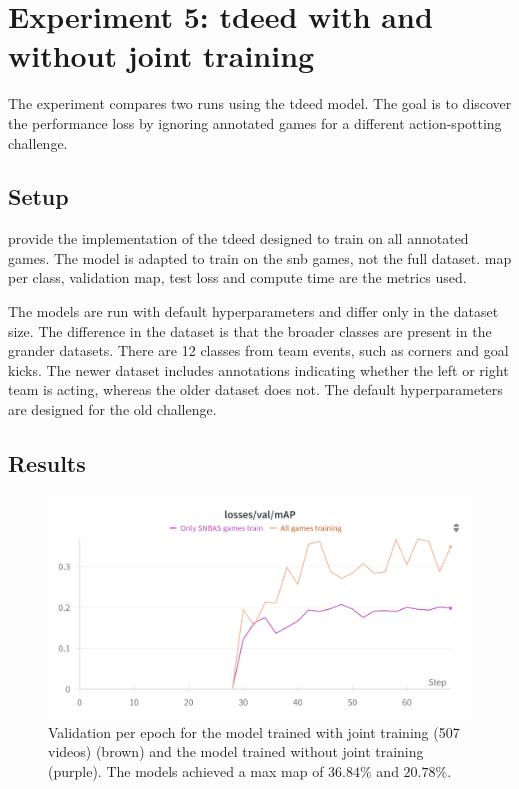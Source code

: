 \section{Experiment 5: \acrshort{tdeed} with and without joint training}
\label{sec:experiment_5}

The experiment compares two runs using the \acrfull{tdeed} model. The goal is to discover the performance loss by ignoring annotated games for a different action-spotting challenge. 

\subsection{Setup}
\label{ssec:ex5_setup}

\textcite{cioppa_soccernet_2024} provide the implementation of the \acrshort{tdeed} designed to train on all annotated games. The model is adapted to train on the \acrshort{snb} games, not the full dataset. \acrshort{map} per class, validation \acrshort{map}, test loss and compute time are the metrics used. 

The models are run with default hyperparameters and differ only in the dataset size. The difference in the dataset is that the broader classes are present in the grander datasets. There are 12 classes from team events, such as corners and goal kicks. The newer dataset includes annotations indicating whether the left or right team is acting, whereas the older dataset does not. The default hyperparameters are designed for the old challenge. 


\subsection{Results}
\label{ssec:ex5_results}

\begin{figure}
    \centering
    \includegraphics[width=0.75\linewidth]{figures/500_7_val_compare.png}
    \caption{Validation per epoch for the model trained with joint training (507 videos) (brown) and the model trained without joint training (purple). The models achieved a max \acrshort{map} of $36.84\%$ and $20.78\%$. }
    \label{fig:500_7_val_compare}
\end{figure}


